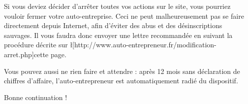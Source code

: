 ﻿Si vous deviez décider d’arrêter toutes vos actions sur le site, vous pourriez vouloir fermer votre auto-entreprise.
Ceci ne peut malheureusement pas se faire directement depuis Internet, afin d’éviter des abus et des désinscriptions sauvages. Il vous faudra donc envoyer une lettre recommandée en suivant la procédure décrite sur \l[http://www.auto-entrepreneur.fr/modification-arret.php]{cette page}.

Vous pouvez aussi ne rien faire et attendre :     après 12 mois sans déclaration de chiffres d’affaire, l’auto-entrepreneur est automatiquement radié du dispositif.

Bonne continuation !
